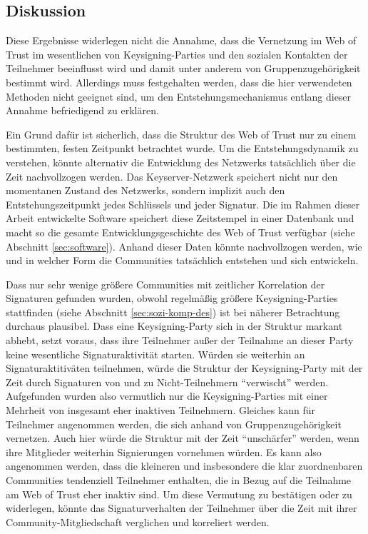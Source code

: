 \subsection{Diskussion}
\label{sec:gesamtb-comm}

Diese Ergebnisse widerlegen nicht die Annahme, dass die Vernetzung im
Web of Trust im wesentlichen von Keysigning-Parties und den sozialen
Kontakten der Teilnehmer beeinflusst wird und damit unter anderem von
Gruppenzugehörigkeit bestimmt wird. Allerdings muss festgehalten
werden, dass die hier verwendeten Methoden nicht geeignet sind, um den
Entstehungsmechanismus entlang dieser Annahme befriedigend zu
erklären. 

Ein Grund dafür ist sicherlich, dass die Struktur des Web of Trust nur
zu einem bestimmten, festen Zeitpunkt betrachtet wurde. Um die
Entstehungsdynamik zu verstehen, könnte alternativ die Entwicklung des
Netzwerks tatsächlich über die Zeit nachvollzogen werden. Das
Keyserver-Netzwerk speichert nicht nur den momentanen Zustand des
Netzwerks, sondern implizit auch den Entstehungszeitpunkt jedes
Schlüssels und jeder Signatur. Die im Rahmen dieser Arbeit entwickelte
Software speichert diese Zeitstempel in einer Datenbank und macht so
die gesamte Entwicklungsgeschichte des Web of Trust verfügbar (siehe
Abschnitt \ref{sec:software}). Anhand dieser Daten könnte
nachvollzogen werden, wie und in welcher Form die Communities
tatsächlich entstehen und sich entwickeln.

Dass nur sehr wenige grö{\ss}ere Communities mit zeitlicher Korrelation
der Signaturen gefunden wurden, obwohl regelmäßig grö{\ss}ere
Keysigning-Parties stattfinden (siehe Abschnitt
\ref{sec:sozi-komp-des}) ist bei näherer Betrachtung durchaus
plausibel. Dass eine Keysigning-Party sich in der Struktur markant
abhebt, setzt voraus, dass ihre Teilnehmer außer der Teilnahme an
dieser Party keine wesentliche Signaturaktivität starten. Würden
sie weiterhin an Signaturaktitiväten teilnehmen, würde die
Struktur der Keysigning-Party mit der Zeit durch Signaturen von und zu
Nicht-Teilnehmern "`verwischt"' werden. Aufgefunden wurden also
vermutlich nur die Keysigning-Parties mit einer Mehrheit von insgesamt
eher inaktiven Teilnehmern. Gleiches kann für Teilnehmer angenommen
werden, die sich anhand von Gruppenzugehörigkeit vernetzen. Auch
hier würde die Struktur mit der Zeit "`unschärfer"' werden, wenn
ihre Mitglieder weiterhin Signierungen vornehmen würden. Es kann
also angenommen werden, dass die kleineren und insbesondere die klar
zuordnenbaren Communities tendenziell Teilnehmer enthalten, die in
Bezug auf die Teilnahme am Web of Trust eher inaktiv sind. Um diese
Vermutung zu bestätigen oder zu widerlegen, könnte das
Signaturverhalten der Teilnehmer über die Zeit mit ihrer
Community-Mitgliedschaft verglichen und korreliert werden.

